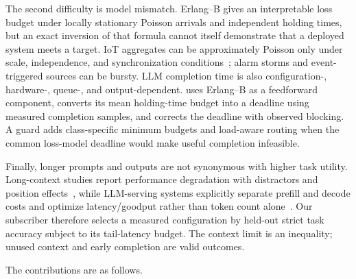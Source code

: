 The second difficulty is model mismatch. Erlang--B gives an interpretable loss budget under locally stationary Poisson arrivals and independent holding times, but an exact inversion of that formula cannot itself demonstrate that a deployed system meets a target. IoT aggregates can be approximately Poisson only under scale, independence, and synchronization conditions~\cite{metzger2019modeling,lopez2020aggregated}; alarm storms and event-triggered sources can be bursty. LLM completion time is also configuration-, hardware-, queue-, and output-dependent. \method{} uses Erlang--B as a feedforward component, converts its mean holding-time budget into a deadline using measured completion samples, and corrects the deadline with observed blocking. A guard adds class-specific minimum budgets and load-aware routing when the common loss-model deadline would make useful completion infeasible.

Finally, longer prompts and outputs are not synonymous with higher task utility. Long-context studies report performance degradation with distractors and position effects~\cite{liu2024lost,hsieh2024ruler}, while LLM-serving systems explicitly separate prefill and decode costs and optimize latency/goodput rather than token count alone~\cite{kwon2023vllm,agrawal2024sarathi,zhong2024distserve}. Our subscriber therefore selects a measured configuration by held-out strict task accuracy subject to its tail-latency budget. The context limit is an inequality; unused context and early completion are valid outcomes.

The contributions are as follows.

